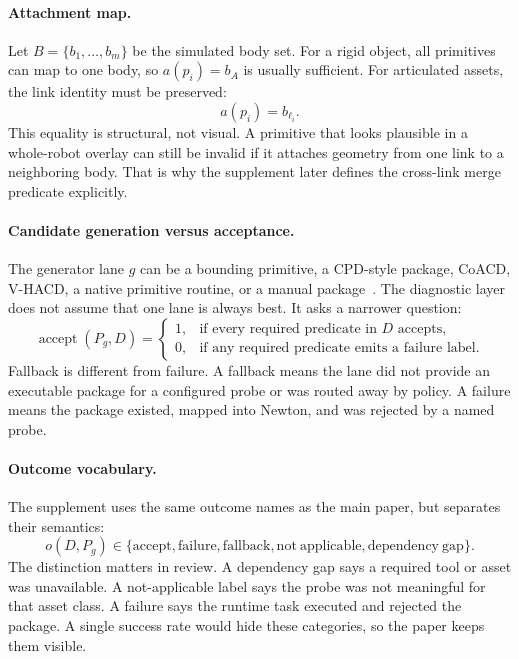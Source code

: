 \paragraph{Attachment map.}
Let $B=\{b_1,\ldots,b_m\}$ be the simulated body set. For a rigid object, all primitives can map to
one body, so $a(p_i)=b_A$ is usually sufficient. For articulated assets, the link identity must be
preserved:
\[
  a(p_i) = b_{\ell_i}.
\]
This equality is structural, not visual. A primitive that looks plausible in a whole-robot overlay
can still be invalid if it attaches geometry from one link to a neighboring body. That is why the
supplement later defines the cross-link merge predicate explicitly.

\paragraph{Candidate generation versus acceptance.}
The generator lane $g$ can be a bounding primitive, a CPD-style package, CoACD, V-HACD, a native
primitive routine, or a manual package~\cite{cpd2026,coacd2022,vhacd}. The diagnostic layer does
not assume that one lane is always best. It asks a narrower question:
\[
  \operatorname{accept}(P_g,D) =
  \begin{cases}
    1, & \text{if every required predicate in }D\text{ accepts},\\
    0, & \text{if any required predicate emits a failure label}.
  \end{cases}
\]
Fallback is different from failure. A fallback means the lane did not provide an executable package
for a configured probe or was routed away by policy. A failure means the package existed, mapped
into Newton, and was rejected by a named probe.

\paragraph{Outcome vocabulary.}
The supplement uses the same outcome names as the main paper, but separates their semantics:
\[
  o(D,P_g) \in
  \{\mathrm{accept}, \mathrm{failure}, \mathrm{fallback},
  \mathrm{not\ applicable}, \mathrm{dependency\ gap}\}.
\]
The distinction matters in review. A dependency gap says a required tool or asset was unavailable.
A not-applicable label says the probe was not meaningful for that asset class. A failure says the
runtime task executed and rejected the package. A single success rate would hide these categories,
so the paper keeps them visible.

